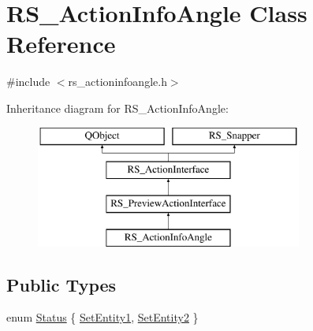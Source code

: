 \hypertarget{classRS__ActionInfoAngle}{\section{R\-S\-\_\-\-Action\-Info\-Angle Class Reference}
\label{classRS__ActionInfoAngle}
}


{\ttfamily \#include $<$rs\-\_\-actioninfoangle.\-h$>$}

Inheritance diagram for R\-S\-\_\-\-Action\-Info\-Angle\-:\begin{figure}[H]
\begin{center}
\leavevmode
\includegraphics[height=4.000000cm]{classRS__ActionInfoAngle}
\end{center}
\end{figure}
\subsection*{Public Types}
\begin{DoxyCompactItemize}
\item 
enum \hyperlink{classRS__ActionInfoAngle_a6679ade78c6497eec42e7ca76b486860}{Status} \{ \hyperlink{classRS__ActionInfoAngle_a6679ade78c6497eec42e7ca76b486860afea0b0ff6a75624ddc9b22c649716870}{Set\-Entity1}, 
\hyperlink{classRS__ActionInfoAngle_a6679ade78c6497eec42e7ca76b486860a93c5b9272b59671ec3570a61b69b769d}{Set\-Entity2}
 \}
\end{DoxyCompactItemize}
